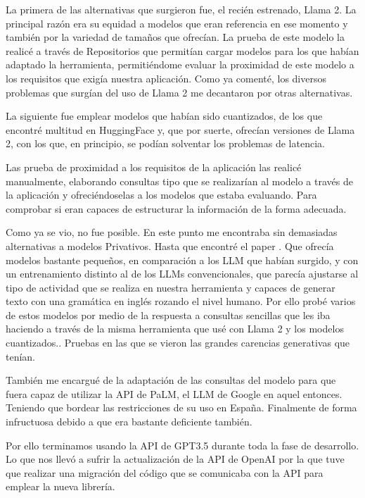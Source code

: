La primera de las alternativas que surgieron fue, el recién estrenado, Llama 2. La principal razón era su equidad a modelos que eran referencia en ese momento y también por la variedad de tamaños que ofrecían. La prueba de este modelo la realicé a través de Repositorios que permitían cargar modelos para los que habían adaptado la herramienta, permitiéndome evaluar la proximidad de este modelo a los requisitos que exigía nuestra aplicación. Como ya comenté, los diversos problemas que surgían del uso de Llama 2 me decantaron por otras alternativas.

La siguiente fue emplear modelos que habían sido cuantizados, de los que encontré multitud en HuggingFace y, que por suerte, ofrecían versiones de Llama 2, con los que, en principio, se podían solventar los problemas de latencia.

Las prueba de proximidad a los requisitos de la aplicación las realicé manualmente, elaborando consultas tipo que se realizarían al modelo a través de la aplicación y ofreciéndoselas a los modelos que estaba evaluando. Para comprobar si eran capaces de estructurar la información de la forma adecuada.

Como ya se vio, no fue posible. En este punto me encontraba sin demasiadas alternativas a modelos Privativos. Hasta que encontré el paper \cite{eldan2023tinystories} . Que ofrecía modelos bastante pequeños, en comparación a los LLM que habían surgido, y con un entrenamiento distinto al de los LLMs convencionales, que parecía ajustarse al tipo de actividad que se realiza en nuestra herramienta y capaces de generar texto con una gramática en inglés rozando el nivel humano. Por ello probé varios de estos modelos por medio de la respuesta a consultas sencillas que les iba haciendo a través de la misma herramienta que usé con Llama 2 y los modelos cuantizados.. Pruebas en las que se vieron las grandes carencias generativas que tenían.

También me encargué de la adaptación de las consultas del modelo para que fuera capaz de utilizar la API de PaLM, el LLM de Google en aquel entonces. Teniendo que bordear las restricciones de su uso en España. Finalmente de forma infructuosa debido a que era bastante deficiente también.

Por ello terminamos usando la API de GPT3.5 durante toda la fase de desarrollo. Lo que nos llevó a sufrir la actualización de la API de OpenAI por la que tuve que realizar una migración del código que se comunicaba con la API para emplear la nueva librería.


